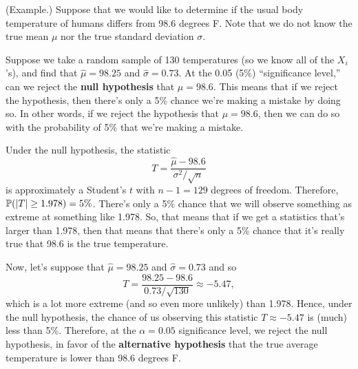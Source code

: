 \begin{mdframed}[]
    (Example.) Suppose that we would like to determine if the usual body temperature of humans differs from 98.6 degrees F. Note that we do not know the true mean $\mu$ nor the true standard deviation $\sigma$. 

    \bigskip 

    Suppose we take a random sample of 130 temperatures (so we know all of the $X_i$'s), and find that $\hat{\mu} = 98.25$ and $\hat{\sigma} = 0.73$. At the 0.05 (5\%) ``significance level,'' can we reject the \textbf{null hypothesis} that $\mu = 98.6$. This means that if we reject the hypothesis, then there's only a 5\% chance we're making a mistake by doing so. In other words, if we reject the hypothesis that $\mu = 98.6$, then we can do so with the probability of 5\% that we're making a mistake.
    
    \bigskip 

    Under the null hypothesis, the statistic 
    \[T = \frac{\hat{\mu} - 98.6}{\sigma^2 / \sqrt{n}}\]
    is approximately a Student's $t$ with $n - 1 = 129$ degrees of freedom. Therefore, $\mathbb{P}(|T| \geq 1.978) = 5\%$. There's only a 5\% chance that we will observe something as extreme at something like 1.978. So, that means that if we get a statistics that's larger than 1.978, then that means that there's only a 5\% chance that it's really true that 98.6 is the true temperature. 

    \bigskip 

    Now, let's suppose that $\hat{\mu} = 98.25$ and $\hat{\sigma} = 0.73$ and so 
    \[T = \frac{98.25 - 98.6}{0.73 / \sqrt{130}} \approx -5.47,\]
    which is a lot more extreme (and so even more unlikely) than 1.978. Hence, under the null hypothesis, the chance of us observing this statistic $T \approx -5.47$ is (much) less than 5\%. Therefore, at the $\alpha = 0.05$ significance level, we reject the null hypothesis, in favor of the \textbf{alternative hypothesis} that the true average temperature is lower than 98.6 degrees F. 
\end{mdframed}